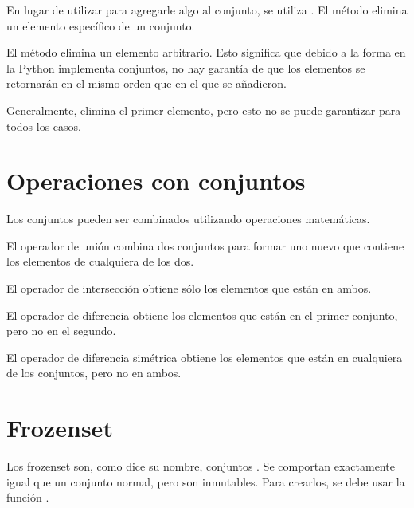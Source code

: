 En lugar de utilizar  para agregarle algo al conjunto, se utiliza .
El método  elimina un elemento específico de un conjunto.


El método  elimina un elemento arbitrario.
Esto significa que debido a la forma en la Python implementa conjuntos, no hay garantía de que los elementos se retornarán en el mismo orden que en el que se añadieron.
\medskip

Generalmente, elimina el primer elemento, pero esto no se puede garantizar para todos los casos.


\section{Operaciones con conjuntos}

Los conjuntos pueden ser combinados utilizando operaciones matemáticas.
\medskip

El operador de unión \ttt{|} combina dos conjuntos para formar uno nuevo que contiene los elementos de cualquiera de los dos.


El operador de intersección \ttt{\&} obtiene sólo los elementos que están en ambos.


El operador de diferencia \ttt{-} obtiene los elementos que están en el primer conjunto, pero no en el segundo.


El operador de diferencia simétrica \ttt{\^} obtiene los elementos que están en cualquiera de los conjuntos, pero no en ambos.


\section{Frozenset}

Los frozenset son, como dice su nombre, conjuntos .
Se comportan exactamente igual que un conjunto normal, pero son inmutables.
Para crearlos, se debe usar la función .


